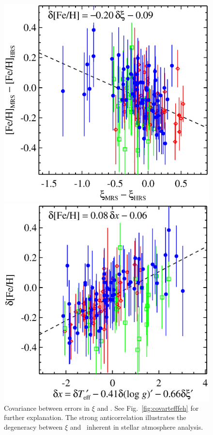 \documentclass{emulateapj}
\begin{document}
\begin{figure}[p]
\centering
\begin{minipage}[t]{0.49\textwidth}
\centering
\includegraphics[width=\textwidth]{covar_vt_feh.eps}
\caption{Covariance between errors in $\xi$ and \feh.  See
  Fig.~\ref{fig:covartefffeh} for further explanation.  The strong
  anticorrelation illustrates the degeneracy between $\xi$ and
  \feh\ inherent in stellar atmosphere analysis.\label{fig:covarvtfeh}}
\end{minipage}
\hfill
\begin{minipage}[t]{0.49\textwidth}
\centering
\includegraphics[width=\textwidth]{leastsquares.eps}

\end{minipage}
\end{figure}
\end{document}
